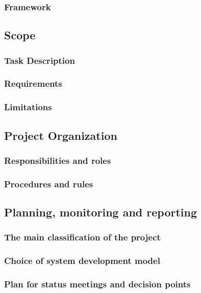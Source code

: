 \documentclass{article}
\begin{document}
\subsubsection{\textbf{Framework}}

\subsection{\textbf{Scope}}
\subsubsection{\textbf{Task Description}}
\subsubsection{\textbf{Requirements}}
\subsubsection{\textbf{Limitations}}

\subsection{\textbf{Project Organization}}
\subsubsection{\textbf{Responsibilities and roles}}
\subsubsection{\textbf{Procedures and rules}}

\subsection{\textbf{Planning, monitoring and reporting}}
\subsubsection{\textbf{The main classification of the project}}
\subsubsection{\textbf{Choice of system development model}}
\subsubsection{\textbf{Plan for status meetings and decision points}}
\end{document}
